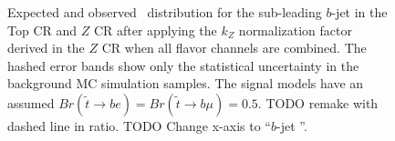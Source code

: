 \begin{figure}
  \centering
  \caption{
    Expected and observed \pt\ distribution for the sub-leading $b$-jet
    in the Top CR and $Z$ CR after applying the $k_Z$ normalization factor
    derived in the $Z$ CR when all flavor channels are combined.
    The hashed error bands show only the statistical uncertainty in the
    background MC simulation samples.
    The signal models have an assumed
    $Br(\tilde{t}\rightarrow be) = Br(\tilde{t}\rightarrow b\mu) = 0.5$.
    {\color{red} TODO remake with dashed line in ratio.}
    {\color{red} TODO Change x-axis to ``$b$-jet \pt''.}
  }
  \label{fig:cr_b_jet_pt_1__w_norm_factor}
\end{figure}

